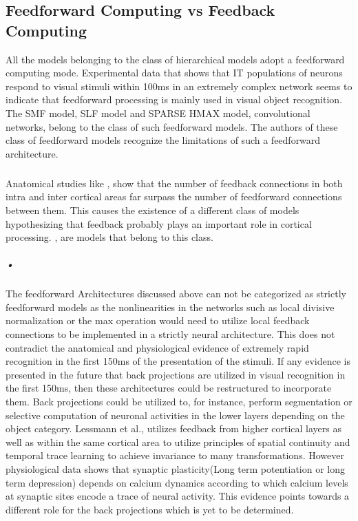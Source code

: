 \documentclass[12pt,twoside]{article}
\theoremstyle{plain}
\theoremstyle{definition}
\theoremstyle{remark}
\begin{document}
\subsection{Feedforward Computing vs Feedback Computing}
All the models belonging to the class of hierarchical models adopt a feedforward computing mode. Experimental data that shows that IT populations of neurons respond to visual stimuli within 100ms\cite{ChouP.Hung.GabrielKreiman2005} in an extremely complex network seems to indicate that feedforward processing is mainly used in visual object recognition\cite{ThomasSerre2007a}. The SMF model, SLF model and SPARSE HMAX model, convolutional networks\cite{K.Kavukcuoglu2009},\cite{Krizhevsky2012} belong to the class of such feedforward models. The authors of these class of feedforward models recognize the limitations of such a feedforward architecture. 
\subparagraph{}
Anatomical studies like \cite{BoyapatiJ1984},\cite{Montero1991} show that the number of feedback connections in both intra and inter cortical areas far surpass the number of feedforward connections between them. This causes the existence of a different class of models hypothesizing that feedback probably plays an important role in cortical processing\cite{Macknik2007}. \cite{MarkusLessmann2014},\cite{DileepGeorge2009} are models that belong to this class.
\subparagraph{•}
The feedforward Architectures discussed above can not be categorized as strictly feedforward models as the nonlinearities in the networks such as local divisive normalization or the max operation would need to utilize local feedback connections to be implemented in a strictly neural architecture. This does not contradict the anatomical and physiological evidence of extremely rapid recognition in the first 150ms of the presentation of the stimuli. If any evidence is presented in the future that back projections are utilized in visual recognition in the first 150ms, then these architectures could be restructured to incorporate them. Back projections could be utilized to, for instance, perform segmentation or selective computation of neuronal activities in the lower layers depending on the object category. Lessmann et al.,\cite{MarkusLessmann2014} utilizes feedback from higher cortical layers as well as within the same cortical area to utilize principles of  spatial continuity and temporal trace learning to achieve invariance to many transformations. However physiological data shows that synaptic plasticity(Long term potentiation or long term depression) depends on calcium dynamics according to which calcium levels at synaptic sites encode a trace of neural activity. This evidence points towards a different role for the back projections which is yet to be determined. 
\end{document}
